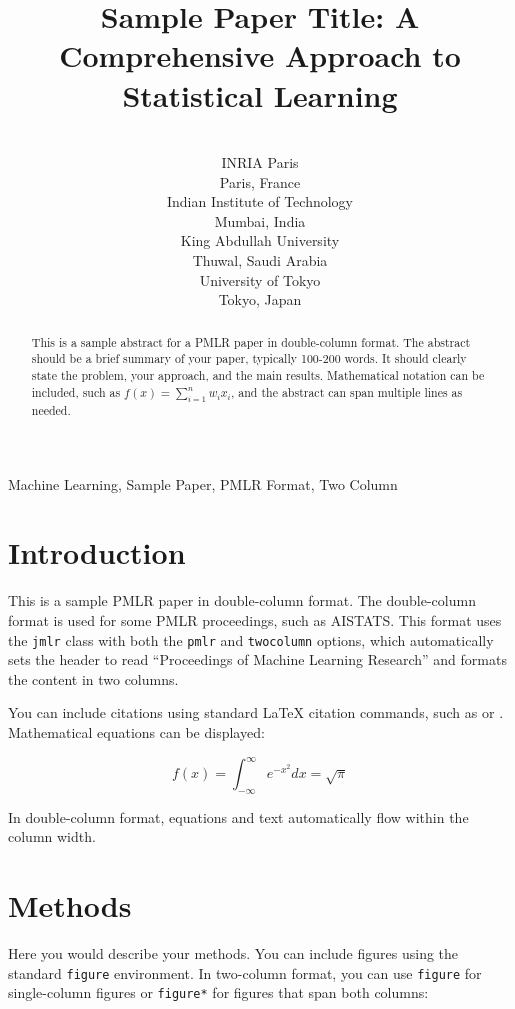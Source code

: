 \documentclass[pmlr,twocolumn]{jmlr} %
\title{Sample Paper Title: A Comprehensive Approach to Statistical Learning}
\author{\Name{{\'E}lise {de la Fontaine}} \Email{elise.delafontaine@example.fr}\\
  \addr INRIA Paris\\
  Paris, France
  \AND
  \Name{Amit Kumar Singh} \Email{amit.singh@example.in}\\
  \addr Indian Institute of Technology\\
  Mumbai, India
  \AND
  \Name{Fatima Al-Rahman} \Email{fatima.alrahman@example.sa}\\
  \addr King Abdullah University\\
  Thuwal, Saudi Arabia
  \AND
  \Name{Yuki Tanaka} \Email{yuki.tanaka@example.jp}\\
  \addr University of Tokyo\\
  Tokyo, Japan
}
\begin{document}
\maketitle

\begin{abstract}
This is a sample abstract for a PMLR paper in double-column format. 
The abstract should be a brief summary of your paper, typically 
100-200 words. It should clearly state the problem, your approach, 
and the main results. Mathematical notation can be included, such as 
$f(x) = \sum_{i=1}^{n} w_i x_i$, and the abstract can span multiple 
lines as needed.
\end{abstract}

\begin{keywords}
Machine Learning, Sample Paper, PMLR Format, Two Column
\end{keywords}

\section{Introduction}

This is a sample PMLR paper in double-column format. The double-column
format is used for some PMLR proceedings, such as AISTATS. This format
uses the \texttt{jmlr} class with both the \texttt{pmlr} and 
\texttt{twocolumn} options, which automatically sets the header to 
read ``Proceedings of Machine Learning Research'' and formats the 
content in two columns.

You can include citations using standard \LaTeX{} citation commands,
such as \citet{example2023} or \citep{example2023}. Mathematical equations can be displayed:

\begin{equation}
  \label{eq:example}
  f(x) = \int_{-\infty}^{\infty} e^{-x^2} dx = \sqrt{\pi}
\end{equation}

In double-column format, equations and text automatically flow
within the column width.

\section{Methods}

Here you would describe your methods. You can include figures using
the standard \texttt{figure} environment. In two-column format, you
can use \texttt{figure} for single-column figures or \texttt{figure*}
for figures that span both columns:
\end{document}
